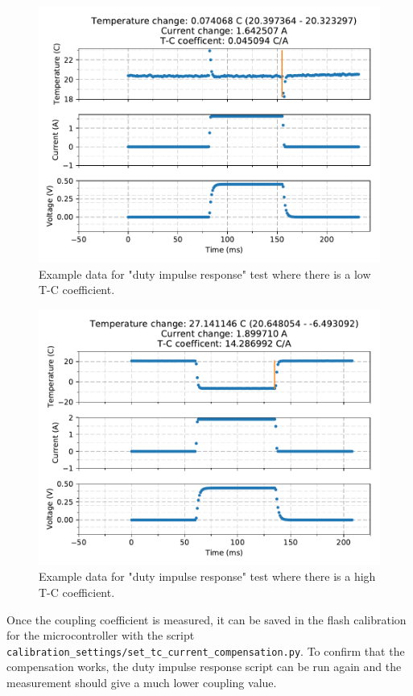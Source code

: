 \documentclass{article}
\begin{document}
\begin{figure}
    \center
    \includegraphics[scale=1]{figures/duty_impulse_response_data_0.pdf} 
    \caption{Example data for "duty impulse response" test where there is a low T-C coefficient.}
    \label{fig:duty_impulse_response_low}
\end{figure}

\begin{figure}
    \center
    \includegraphics[scale=1]{figures/duty_impulse_response_data_1.pdf} 
    \caption{Example data for "duty impulse response" test where there is a high T-C coefficient.}
    \label{fig:duty_impulse_response_high}
\end{figure}

Once the coupling coefficient is measured, it can be saved in the flash calibration for the microcontroller with the script \texttt{calibration\_settings/set\_tc\_current\_compensation.py}. To confirm that the compensation works, the duty impulse response script can be run again and the measurement should give a much lower coupling value.
\end{document}
